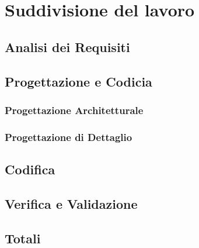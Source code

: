 \section{Suddivisione del lavoro}
\subsection{Analisi dei Requisiti}
\subsection{Progettazione e Codicia}
\subsubsection{Progettazione Architetturale}
\subsubsection{Progettazione di Dettaglio}
\subsection{Codifica}
\subsection{Verifica e Validazione}
\subsection{Totali}